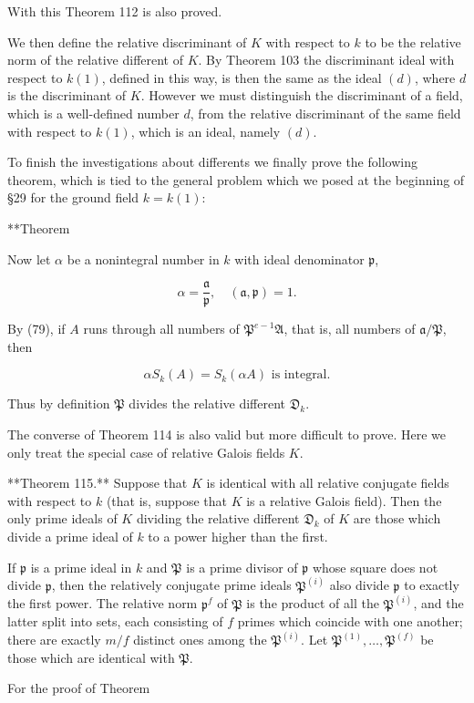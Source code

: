 With this Theorem 112 is also proved.

We then define the relative discriminant of $K$ with respect to $k$ to be the relative norm of the relative different of $K$. By Theorem 103 the discriminant ideal with respect to $k(1)$, defined in this way, is then the same as the ideal $(d)$, where $d$ is the discriminant of $K$. However we must distinguish the discriminant of a field, which is a well-defined number $d$, from the relative discriminant of the same field with respect to $k(1)$, which is an ideal, namely $(d)$.

To finish the investigations about differents we finally prove the following theorem, which is tied to the general problem which we posed at the beginning of §29 for the ground field $k = k(1)$:

**Theorem

Now let $\alpha$ be a nonintegral number in $k$ with ideal denominator $\mathfrak{p}$,

$$\alpha = \frac{\mathfrak{a}}{\mathfrak{p}}, \quad (\mathfrak{a}, \mathfrak{p}) = 1.$$

By (79), if $A$ runs through all numbers of $\mathfrak{P}^{e-1}\mathfrak{A}$, that is, all numbers of $\mathfrak{a}/\mathfrak{P}$, then

$$\alpha S_k(A) = S_k(\alpha A) \text{ is integral.}$$

Thus by definition $\mathfrak{P}$ divides the relative different $\mathfrak{D}_k$.

The converse of Theorem 114 is also valid but more difficult to prove. Here we only treat the special case of relative Galois fields $K$.

**Theorem 115.** Suppose that $K$ is identical with all relative conjugate fields with respect to $k$ (that is, suppose that $K$ is a relative Galois field). Then the only prime ideals of $K$ dividing the relative different $\mathfrak{D}_k$ of $K$ are those which divide a prime ideal of $k$ to a power higher than the first.

If $\mathfrak{p}$ is a prime ideal in $k$ and $\mathfrak{P}$ is a prime divisor of $\mathfrak{p}$ whose square does not divide $\mathfrak{p}$, then the relatively conjugate prime ideals $\mathfrak{P}^{(i)}$ also divide $\mathfrak{p}$ to exactly the first power. The relative norm $\mathfrak{p}^f$ of $\mathfrak{P}$ is the product of all the $\mathfrak{P}^{(i)}$, and the latter split into sets, each consisting of $f$ primes which coincide with one another; there are exactly $m/f$ distinct ones among the $\mathfrak{P}^{(i)}$. Let $\mathfrak{P}^{(1)}, \ldots, \mathfrak{P}^{(f)}$ be those which are identical with $\mathfrak{P}$.

For the proof of Theorem
